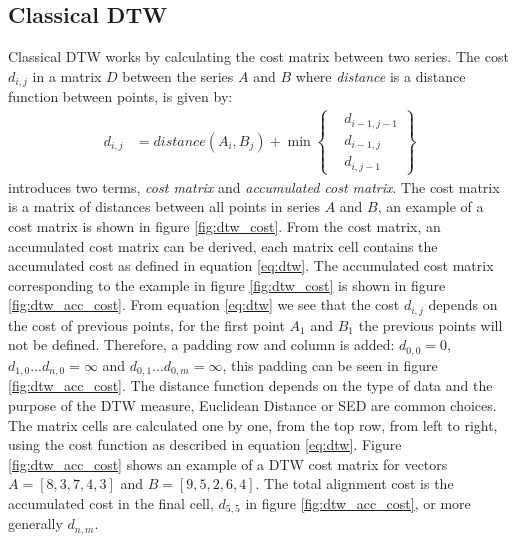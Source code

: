 \subsection{Classical DTW}
Classical DTW works by calculating the cost matrix between two series. The cost $d_{i,j}$ in a matrix $D$ between the series $A$ and $B$ where \textit{distance} is a distance function between points, is given by:
\begin{equation}
    \label{eq:dtw}
    \begin{aligned}
        d_{i, j} & = distance(A_{i}, B_{j}) + \min \left\{ \begin{aligned}
                                                                & d_{i-1, j-1} \\
                                                                & d_{i-1, j}   \\
                                                                & d_{i, j-1}
                                                           \end{aligned} \right\}
    \end{aligned}
\end{equation}
\textcite{muller2007dynamic} introduces two terms, \textit{cost matrix} and \textit{accumulated cost matrix}. The cost matrix is a matrix of distances between all points in series $A$ and $B$, an example of a cost matrix is shown in figure \ref{fig:dtw_cost}. From the cost matrix, an accumulated cost matrix can be derived, each matrix cell contains the accumulated cost as defined in equation \ref{eq:dtw}. The accumulated cost matrix corresponding to the example in figure \ref{fig:dtw_cost} is shown in figure \ref{fig:dtw_acc_cost}. From equation \ref{eq:dtw} we see that the cost $d_{i, j}$ depends on the cost of previous points, for the first point $A_{1}$ and $B_{1}$ the previous points will not be defined. Therefore, a padding row and column is added: $d_{0,0} = 0$, $d_{1, 0}...d_{n, 0} = \infty$ and $d_{0, 1}...d_{0, m} = \infty$, this padding can be seen in figure \ref{fig:dtw_acc_cost}. The distance function depends on the type of data and the purpose of the DTW measure, Euclidean Distance or SED are common choices. The matrix cells are calculated one by one, from the top row, from left to right, using the cost function as described in equation \ref{eq:dtw}. Figure \ref{fig:dtw_acc_cost} shows an example of a DTW cost matrix for vectors $A = [8, 3, 7, 4, 3]$ and $B = [9, 5, 2, 6, 4]$. The total alignment cost is the accumulated cost in the final cell, $d_{5,5}$ in figure \ref{fig:dtw_acc_cost}, or more generally $d_{n,m}$.

